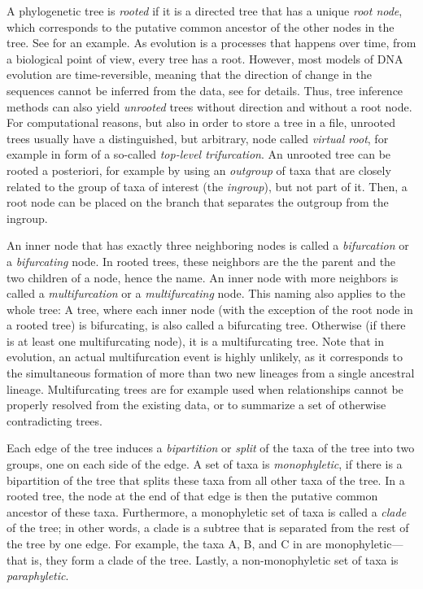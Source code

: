 A phylogenetic tree is \emph{rooted}
if it is a directed tree that has a unique \emph{root node},
which corresponds to the putative common ancestor of the other nodes in the tree.
See  for an example.
As evolution is a processes that happens over time,
from a biological point of view, every tree has a root.
However, most models of DNA evolution are time-reversible,
meaning that the direction of change in the sequences cannot be inferred from the data,
see  for details.
Thus, tree inference methods can also yield \emph{unrooted} trees without direction and without a root node.
For computational reasons, but also in order to store a tree in a file,
unrooted trees usually have a distinguished, but arbitrary, node called \emph{virtual root},
for example in form of a so-called \emph{top-level trifurcation}.
An unrooted tree can be rooted a posteriori, for example by using an \emph{outgroup} of taxa
that are closely related to the group of taxa of interest (the \emph{ingroup}), but not part of it.
Then, a root node can be placed on the branch that separates the outgroup from the ingroup.

An inner node that has exactly three neighboring nodes is called a \emph{bifurcation} or a \emph{bifurcating} node.
In rooted trees, these neighbors are the the parent and the two children of a node, hence the name.
An inner node with more neighbors is called a \emph{multifurcation} or a \emph{multifurcating} node.
This naming also applies to the whole tree:
A tree, where each inner node (with the exception of the root node in a rooted tree) is bifurcating,
is also called a bifurcating tree.
Otherwise (if there is at least one multifurcating node), it is a multifurcating tree.
Note that in evolution, an actual multifurcation event is highly unlikely,
as it corresponds to the simultaneous formation of more than two new lineages from a single ancestral lineage.
Multifurcating trees are for example used when relationships cannot be properly resolved from the existing data,
or to summarize a set of otherwise contradicting trees.

Each edge of the tree induces a \emph{bipartition} or \emph{split} of the taxa of the tree into two groups,
one on each side of the edge.
A set of taxa is \emph{monophyletic},
if there is a bipartition of the tree that splits these taxa from all other taxa of the tree.
In a rooted tree, the node at the end of that edge is then the putative common ancestor of these taxa.
Furthermore, a monophyletic set of taxa is called a \emph{clade} of the tree;
in other words, a clade is a subtree that is separated from the rest of the tree by one edge.
For example, the taxa {\sffamily A}, {\sffamily B}, and {\sffamily C} in  are monophyletic---%
that is, they form a clade of the tree.
Lastly, a non-monophyletic set of taxa is \emph{paraphyletic}.

